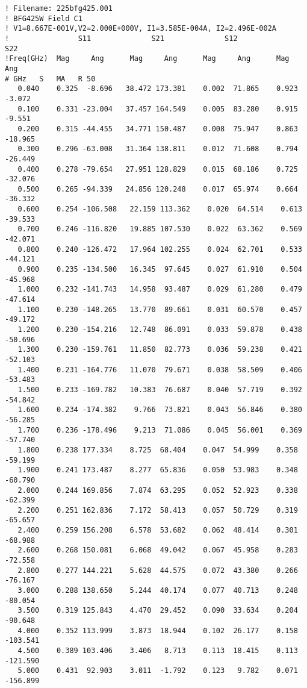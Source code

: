 \begin{verbatim}
! Filename: 225bfg425.001
! BFG425W Field C1
! V1=8.667E-001V,V2=2.000E+000V, I1=3.585E-004A, I2=2.496E-002A
!                S11              S21              S12              S22
!Freq(GHz)  Mag     Ang      Mag     Ang      Mag     Ang      Mag     Ang 
# GHz   S   MA   R 50
   0.040    0.325  -8.696   38.472 173.381    0.002  71.865    0.923  -3.072
   0.100    0.331 -23.004   37.457 164.549    0.005  83.280    0.915  -9.551
   0.200    0.315 -44.455   34.771 150.487    0.008  75.947    0.863 -18.965
   0.300    0.296 -63.008   31.364 138.811    0.012  71.608    0.794 -26.449
   0.400    0.278 -79.654   27.951 128.829    0.015  68.186    0.725 -32.076
   0.500    0.265 -94.339   24.856 120.248    0.017  65.974    0.664 -36.332
   0.600    0.254 -106.508   22.159 113.362    0.020  64.514    0.613 -39.533
   0.700    0.246 -116.820   19.885 107.530    0.022  63.362    0.569 -42.071
   0.800    0.240 -126.472   17.964 102.255    0.024  62.701    0.533 -44.121
   0.900    0.235 -134.500   16.345  97.645    0.027  61.910    0.504 -45.968
   1.000    0.232 -141.743   14.958  93.487    0.029  61.280    0.479 -47.614
   1.100    0.230 -148.265   13.770  89.661    0.031  60.570    0.457 -49.172
   1.200    0.230 -154.216   12.748  86.091    0.033  59.878    0.438 -50.696
   1.300    0.230 -159.761   11.850  82.773    0.036  59.238    0.421 -52.103
   1.400    0.231 -164.776   11.070  79.671    0.038  58.509    0.406 -53.483
   1.500    0.233 -169.782   10.383  76.687    0.040  57.719    0.392 -54.842
   1.600    0.234 -174.382    9.766  73.821    0.043  56.846    0.380 -56.285
   1.700    0.236 -178.496    9.213  71.086    0.045  56.001    0.369 -57.740
   1.800    0.238 177.334    8.725  68.404    0.047  54.999    0.358 -59.199
   1.900    0.241 173.487    8.277  65.836    0.050  53.983    0.348 -60.790
   2.000    0.244 169.856    7.874  63.295    0.052  52.923    0.338 -62.399
   2.200    0.251 162.836    7.172  58.413    0.057  50.729    0.319 -65.657
   2.400    0.259 156.208    6.578  53.682    0.062  48.414    0.301 -68.988
   2.600    0.268 150.081    6.068  49.042    0.067  45.958    0.283 -72.558
   2.800    0.277 144.221    5.628  44.575    0.072  43.380    0.266 -76.167
   3.000    0.288 138.650    5.244  40.174    0.077  40.713    0.248 -80.054
   3.500    0.319 125.843    4.470  29.452    0.090  33.634    0.204 -90.648
   4.000    0.352 113.999    3.873  18.944    0.102  26.177    0.158 -103.541
   4.500    0.389 103.406    3.406   8.713    0.113  18.415    0.113 -121.590
   5.000    0.431  92.903    3.011  -1.792    0.123   9.782    0.071 -156.899

\end{verbatim}
